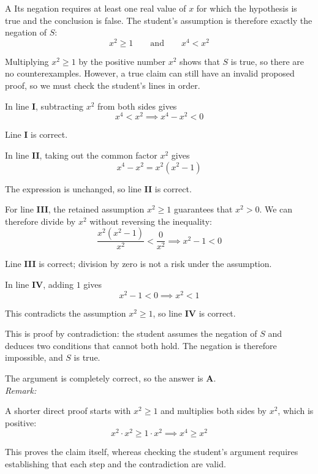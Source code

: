 \documentclass[11pt,a4paper]{article}
\begin{document}
\begin{enumerate}[label=\textbf{\arabic*.},leftmargin=*,itemsep=0pt,start=17]
\begin{djsSolution}{A}
Its negation requires at least one real value of $x$ for which the hypothesis is true and the conclusion is false. The student's assumption is therefore exactly the negation of $S$:
\[
x^2\ge1\qquad\text{and}\qquad x^4<x^2
\]

Multiplying $x^2\ge1$ by the positive number $x^2$ shows that $S$ is true, so there are no counterexamples. However, a true claim can still have an invalid proposed proof, so we must check the student's lines in order.

In line \textbf{I}, subtracting $x^2$ from both sides gives
\[
x^4<x^2\implies x^4-x^2<0
\]

Line \textbf{I} is correct.

In line \textbf{II}, taking out the common factor $x^2$ gives
\[
x^4-x^2=x^2(x^2-1)
\]

The expression is unchanged, so line \textbf{II} is correct.

For line \textbf{III}, the retained assumption $x^2\ge1$ guarantees that $x^2>0$. We can therefore divide by $x^2$ without reversing the inequality:
\[
\frac{x^2(x^2-1)}{x^2}<\frac{0}{x^2}
\implies x^2-1<0
\]

Line \textbf{III} is correct; division by zero is not a risk under the assumption.

In line \textbf{IV}, adding $1$ gives
\[
x^2-1<0\implies x^2<1
\]

This contradicts the assumption $x^2\ge1$, so line \textbf{IV} is correct.

This is proof by contradiction: the student assumes the negation of $S$ and deduces two conditions that cannot both hold. The negation is therefore impossible, and $S$ is true.

The argument is completely correct, so the answer is \textbf{A}.\\[5pt]

\textit{Remark:}

A shorter direct proof starts with $x^2\ge1$ and multiplies both sides by $x^2$, which is positive:
\[
x^2\cdot x^2\ge1\cdot x^2
\implies x^4\ge x^2
\]

This proves the claim itself, whereas checking the student's argument requires establishing that each step and the contradiction are valid.
\end{djsSolution}
\end{enumerate}
\clearpage
\thispagestyle{djssolutions}
\vspace*{8pt}
\end{document}
